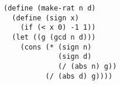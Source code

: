 \documentclass[a4paper,12pt]{article}
\begin{document}
\begin{lstlisting}
(define (make-rat n d)
  (define (sign x)
    (if (< x 0) -1 1))
  (let ((g (gcd n d)))
    (cons (* (sign n)
             (sign d)
             (/ (abs n) g))
          (/ (abs d) g))))
\end{lstlisting}
\end{document}
